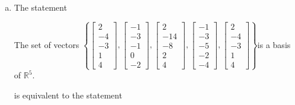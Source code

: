 \begin{exerciseAnswer}
\begin{enumerate}[(a)]
\item The statement 
\begin{center}\begin{minipage}{0.8\textwidth}
 The set of vectors \( \left\{ \left[\begin{array}{c}
2 \\
-4 \\
-3 \\
1 \\
4
\end{array}\right] , \left[\begin{array}{c}
-1 \\
-3 \\
-1 \\
0 \\
-2
\end{array}\right] , \left[\begin{array}{c}
2 \\
-14 \\
-8 \\
2 \\
4
\end{array}\right] , \left[\begin{array}{c}
-1 \\
-3 \\
-5 \\
-2 \\
-4
\end{array}\right] , \left[\begin{array}{c}
2 \\
-4 \\
-3 \\
1 \\
4
\end{array}\right] \right\} \)is a basis of \(\mathbb{R}^5\). 
\end{minipage}\end{center}
     is equivalent to the statement 
\begin{center}\begin{minipage}{0.8\textwidth}
 The set of vectors \( \left\{ \left[\begin{array}{c}
2 \\
-4 \\
-3 \\
1 \\
4
\end{array}\right] , \left[\begin{array}{c}
-1 \\
-3 \\

\end{array}
\end{minipage}
\end{center}
\end{enumerate}
\end{exerciseAnswer}

